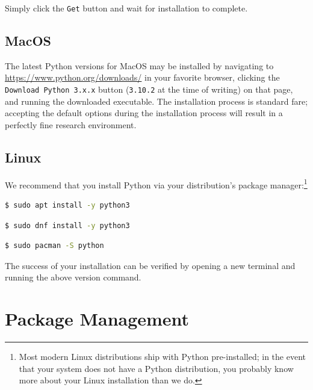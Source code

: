 \documentclass[12pt]{article}
\begin{document}
Simply click the \texttt{Get} button and wait for installation to complete.

\subsection{MacOS}\label{sec:installation-mac-os}

The latest Python versions for MacOS may be installed by navigating to \url{https://www.python.org/downloads/} in your
favorite browser, clicking the \texttt{Download Python 3.x.x} button (\texttt{3.10.2} at the time of writing) on that 
page, and running the downloaded executable. The installation process is standard fare; accepting the default options 
during the installation process will result in a perfectly fine research environment.

\subsection{Linux}\label{sec:installation-linux}

We recommend that you install Python via your distribution's package manager:\footnote{
    Most modern Linux distributions ship with Python pre-installed; in the event that your system does not have a Python
    distribution, you probably know more about your Linux installation than we do.
}

\begin{lstlisting}[language=bash, caption=Debian/Ubuntu]
$ sudo apt install -y python3
\end{lstlisting}

\begin{lstlisting}[language=bash, caption=Fedora]
$ sudo dnf install -y python3
\end{lstlisting}

\begin{lstlisting}[language=bash, caption=Arch Linux]
$ sudo pacman -S python
\end{lstlisting}

The success of your installation can be verified by opening a new terminal and running the above version command.


\section{Package Management}\label{sec:package-management}
\end{document}
